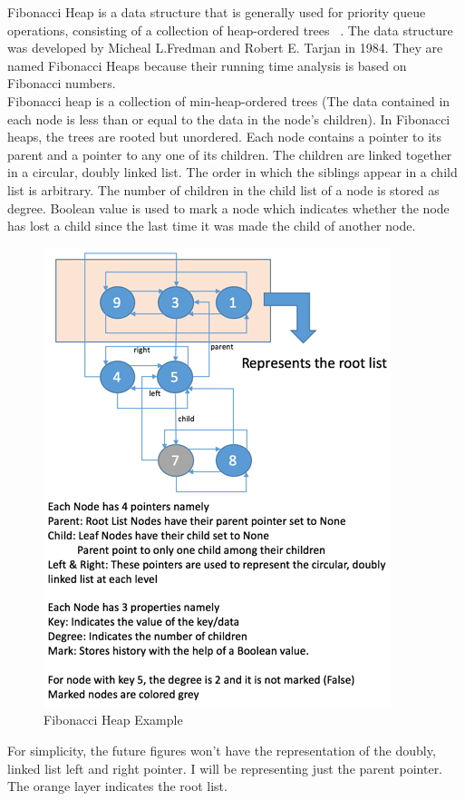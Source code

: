 Fibonacci Heap is a data structure that is generally used for priority queue operations, consisting of a collection of heap-ordered trees~\cite{wikiFiboHeap,cormen2009introduction} . The data structure was developed by Micheal L.Fredman and Robert E. Tarjan in 1984. They are named Fibonacci Heaps because their running time analysis is based on Fibonacci numbers. \\

Fibonacci heap is a collection of min-heap-ordered trees (The data contained in each node is less than or equal to the data  in the node's children). In Fibonacci heaps, the trees are rooted but unordered. Each node contains a pointer to its parent and a pointer to any one of its children. The children are linked together in a circular, doubly linked list. The order in which the siblings appear in a child list is arbitrary. The number of children in the child list of a node is stored as degree. Boolean value is used to mark a node which indicates whether  the node has lost a child since the last time it was made the child of another node.\\

\begin{figure}
	\includegraphics[width=0.95\columnwidth]{Figures/FibonacciHeap}
	\caption{Fibonacci Heap Example}
\end{figure}

For simplicity, the future figures won't have the representation of the doubly, linked list left and right pointer. I will be representing just the parent pointer. The orange layer indicates the root list.


